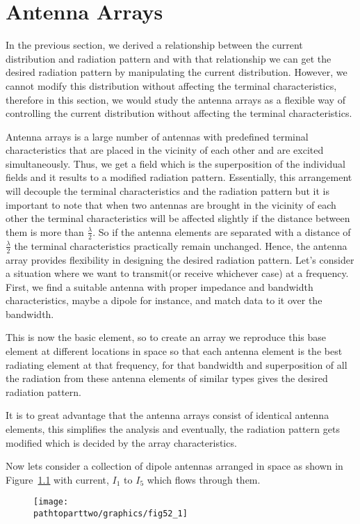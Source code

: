 \chapter{Antenna Arrays}
In the previous section, we derived a relationship between the current distribution and radiation pattern and with that relationship we can get the desired radiation pattern by manipulating the current distribution. However, we cannot modify this distribution without affecting the terminal characteristics, therefore in this section, we would study the antenna arrays as a flexible way of controlling the current distribution without affecting the terminal characteristics.

Antenna arrays is a large number of antennas with predefined terminal characteristics that are placed in the vicinity of each other and are excited simultaneously. Thus, we get a field which is the superposition of the individual fields and it results to a modified radiation pattern. Essentially, this arrangement will decouple the terminal characteristics and the radiation pattern but it is important to note that when two antennas are brought in the vicinity of each other the terminal characteristics will be affected slightly if the distance between them is more than $ \frac{\lambda}{2}$. So if the antenna elements are separated with a distance of $ \frac{\lambda}{2} $ the terminal characteristics practically remain unchanged. Hence, the antenna array provides flexibility in designing the desired radiation pattern. Let's consider a situation where we want to transmit(or receive whichever case) at a frequency. First, we find a suitable antenna with proper impedance and bandwidth characteristics, maybe a dipole for instance, and match data to it over the bandwidth.

This is now the basic element, so to create an array we reproduce this base element at different locations in space so that each antenna element is the best radiating element at that frequency, for that bandwidth and superposition of all the radiation from these antenna elements of similar types gives the desired radiation pattern.

It is to great advantage that the antenna arrays consist of identical antenna elements, this simplifies the analysis and eventually, the radiation pattern gets modified which is decided by the array characteristics.

Now lets consider a collection of dipole antennas arranged in space as shown in Figure~\ref{52.1} with current, $I_1$ to $I_5$ which flows through them.
\begin{figure}[h]
\centering
\texttt{[image: \\pathtoparttwo/graphics/fig52\_1]}
\caption{}
\label{52.1}
\end{figure}

